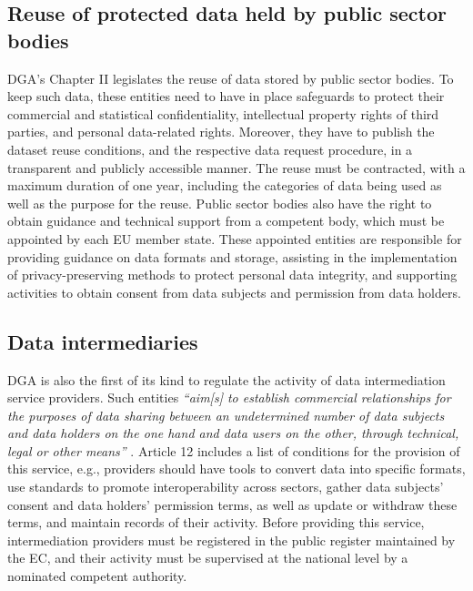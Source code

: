 
\subsection{Reuse of protected data held by public sector bodies}
\label{sec:reuse}

DGA's Chapter II legislates the reuse of data stored by public sector bodies.
To keep such data, these entities need to have in place safeguards to protect their commercial and statistical confidentiality, intellectual property rights of third parties, and personal data-related rights.
Moreover, they have to publish the dataset reuse conditions, and the respective data request procedure, in a transparent and publicly accessible manner.
The reuse must be contracted, with a maximum duration of one year, including the categories of data being used as well as the purpose for the reuse. 
Public sector bodies also have the right to obtain guidance and technical support from a competent body, which must be appointed by each EU member state.
These appointed entities are responsible for providing guidance on data formats and storage, assisting in the implementation of privacy-preserving methods to protect personal data integrity, and supporting activities to obtain consent from data subjects and permission from data holders.

\subsection{Data intermediaries}
\label{sec:intermediation}

DGA is also the first of its kind to regulate the activity of data intermediation service providers.
Such entities \textit{``aim[s] to establish commercial relationships for the purposes of data sharing between an undetermined number of data subjects and data holders on the one hand and data users on the other, through technical, legal or other means''} \citeyearpar{noauthor_regulation_2022}.
Article 12 includes a list of conditions for the provision of this service, e.g., providers should have tools to convert data into specific formats, use standards to promote interoperability across sectors, gather data subjects' consent and data holders' permission terms, as well as update or withdraw these terms, and maintain records of their activity.
Before providing this service, intermediation providers must be registered in the public register maintained by the EC, and their activity must be supervised at the national level by a nominated competent authority.

